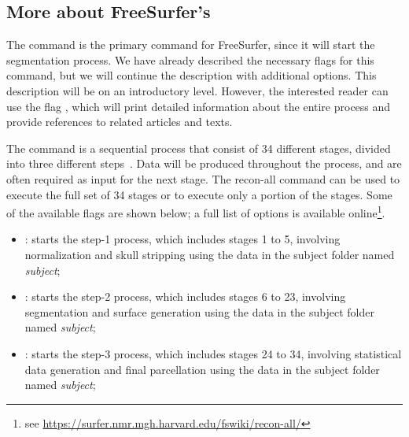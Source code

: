 \subsection{More about FreeSurfer's }
\label{sec:chp3:advanced:recon-all}
%
%
The command  is the primary command for FreeSurfer,
since it will start the segmentation process. We have already
described the necessary flags for this command, but we will continue
the description with additional options. This description will be
on an introductory level. However, the interested reader can use the
flag , which will print detailed information about the
entire process and provide references to related articles and texts.

The command  is a sequential process that consist of 34
different stages, divided into three different
steps~\cite{freesurfer-wiki}. Data will be produced throughout the
process, and are often required as input for the next stage.  The recon-all 
command can be used to execute the full set of 34 stages or to execute only 
a portion of the stages.  Some of the available  flags are 
shown below; a full list of options is available 
online\footnote{see \url{https://surfer.nmr.mgh.harvard.edu/fswiki/recon-all/}}. 
\begin{itemize}
\item {}: starts the step-1 process, which includes stages 1 to 5, involving normalization and skull stripping using the data in the subject folder named \textit{subject}; 
\item {}: starts the step-2 process, which includes stages 6 to 23, involving segmentation and surface generation using the data in the subject folder named \textit{subject};
\item {}: starts the step-3 process, which includes stages 24 to 34, involving statistical data generation and final parcellation using the data in the subject folder named \textit{subject};
\end{itemize} 

